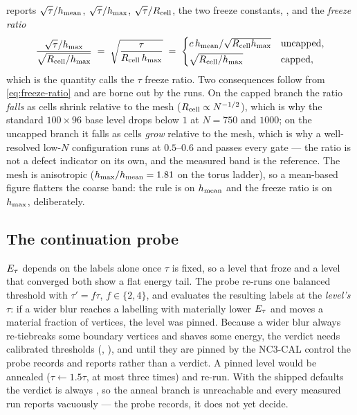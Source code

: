 \documentclass[11pt,a4paper]{article}
\begin{document}
 reports $\sqrt\tau/h_{\mathrm{mean}}$, $\sqrt\tau/h_{\mathrm{max}}$,
$\sqrt\tau/R_{\mathrm{cell}}$, the two freeze constants, , and the
\emph{freeze ratio}
\begin{equation}
  \frac{\sqrt\tau/h_{\mathrm{max}}}{\sqrt{R_{\mathrm{cell}}/h_{\mathrm{max}}}} \;=\; \sqrt{\frac{\tau}{R_{\mathrm{cell}}\, h_{\mathrm{max}}}}
  \;=\;
  \begin{cases}
    c\,h_{\mathrm{mean}}/\sqrt{R_{\mathrm{cell}} h_{\mathrm{max}}} & \text{uncapped},\\[2pt]
    \sqrt{R_{\mathrm{cell}}/h_{\mathrm{max}}} & \text{capped},
  \end{cases}
  \label{eq:freeze-ratio}
\end{equation}
which is the quantity  calls the $\tau$ freeze ratio. Two
consequences follow from \eqref{eq:freeze-ratio} and are borne out by the runs.
On the capped branch the ratio \emph{falls} as cells shrink relative to the mesh
($R_{\mathrm{cell}} \propto N^{-1/2}$), which is why the standard $100 \times 96$ base level
drops below $1$ at $N = 750$ and $1000$; on the uncapped branch it falls as cells
\emph{grow} relative to the mesh, which is why a well-resolved low-$N$
configuration runs at $0.5$--$0.6$ and passes every gate --- the ratio is not a
defect indicator on its own, and the measured band is the reference. The mesh is
anisotropic ($h_{\mathrm{max}}/h_{\mathrm{mean}} = 1.81$ on the torus ladder), so a mean-based figure
flatters the coarse band: the rule is on $h_{\mathrm{mean}}$ and the freeze ratio is on
$h_{\mathrm{max}}$, deliberately.

\subsection{The continuation probe}
\label{sec:probe}

$E_\tau$ depends on the labels alone once $\tau$ is fixed, so a level that froze
and a level that converged both show a flat energy tail. The probe
 re-runs one balanced threshold with
$\tau' = f\tau$, $f \in \{2, 4\}$, and evaluates the resulting labels at the
\emph{level's} $\tau$: if a wider blur reaches a labelling with materially lower
$E_\tau$ and moves a material fraction of vertices, the level was pinned. Because
a wider blur always re-tiebreaks some boundary vertices and shaves some energy,
the verdict needs calibrated thresholds (, ), and
until they are pinned by the NC3-CAL control the probe records and reports
 rather than a verdict. A pinned level would be annealed
($\tau \leftarrow 1.5\tau$, at most three times) and re-run. With the shipped
defaults  the verdict is always , so
the anneal branch is unreachable and every measured run reports
 vacuously --- the probe records, it does not yet decide.
\end{document}
